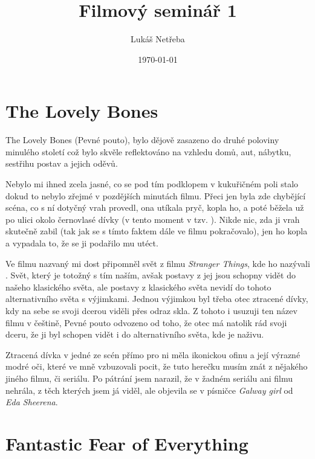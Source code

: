 \documentclass[a4paper, 12pt]{article}
\title{\bf Filmový seminář 1}
\author{Lukáš Netřeba}
\date{\today}
\begin{document}
\maketitle
\newpage
\tableofcontents
\newpage
\section{The Lovely Bones}
\label{LB}
The Lovely Bones (Pevné pouto), bylo dějově zasazeno do druhé poloviny minulého století což bylo skvěle reflektováno na vzhledu domů, aut, nábytku, sestřihu postav a jejich oděvů. 

Nebylo mi ihned zcela jasné, co se pod tím podklopem v kukuřičném poli stalo dokud to nebylo zřejmé v pozdějších minutách filmu. Přeci jen byla zde chybějící scéna, co s ní dotyčný vrah provedl, ona utíkala pryč, kopla ho, a poté běžela už po ulici okolo černovlasé dívky (v tento moment v tzv. ). Nikde nic, zda ji vrah skutečně zabil (tak jak se s tímto faktem dále ve filmu pokračovalo), jen ho kopla a vypadala to, že se ji podařilo mu utéct.

Ve filmu nazvaný  mi dost připomněl svět z filmu {\it Stranger Things}, kde ho nazývali . Svět, který je totožný s tím naším, avšak postavy z jej jsou schopny vidět do našeho klasického světa, ale postavy z klasického světa nevidí do tohoto alternativního světa s výjimkami. Jednou výjimkou byl třeba otec ztracené dívky, kdy na sebe se svoji dcerou viděli přes odraz skla. Z tohoto i usuzuji ten název filmu v češtině, Pevné pouto odvozeno od toho, že otec má natolik rád svoji dceru, že ji byl schopen vidět i do alternativního světa, kde je naživu.

Ztracená dívka v jedné ze scén přímo pro ni měla ikonickou ofinu a její výrazné modré oči, které ve mně vzbuzovali pocit, že tuto herečku musím znát z nějakého jiného filmu, či seriálu. Po pátrání jsem narazil, že v žadném seriálu ani filmu nehrála, z těch kterých jsem já viděl, ale objevila se v písničce {\it Galway girl} od {\it Eda Sheerena}.
\newpage
\section{Fantastic Fear of Everything}
\label{FFoE}
\end{document}
